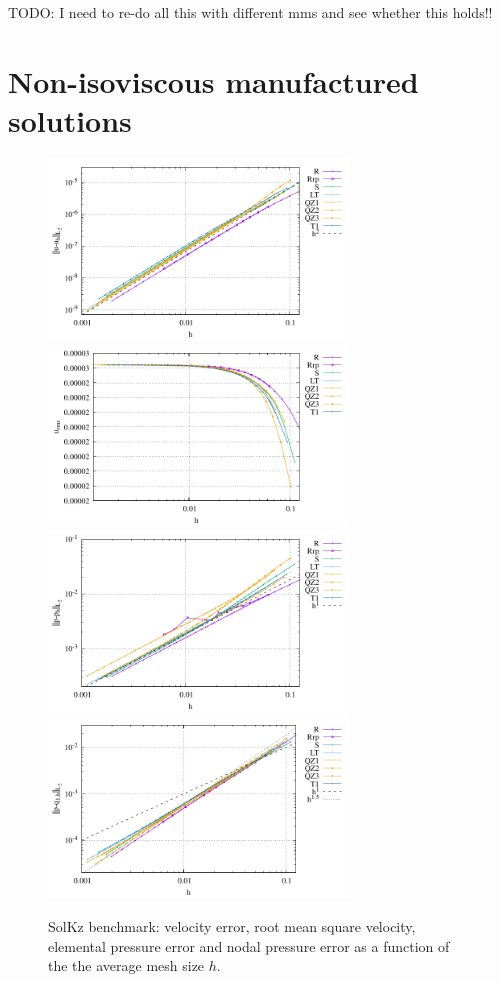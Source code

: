 \documentclass[a4paper]{article}
\begin{document}
{\color{red} TODO: I need to re-do all this with different mms and see whether this holds!!}


\section{Non-isoviscous manufactured solutions}





\begin{figure}
\centering
\includegraphics[width=8cm]{../results/errors_u_exp5}
\includegraphics[width=8cm]{../results/vrms_exp5} \\
\includegraphics[width=8cm]{../results/errors_p_exp5}
\includegraphics[width=8cm]{../results/errors_q1_exp5}
\caption{SolKz benchmark: velocity error, 
root mean square velocity, elemental pressure error and nodal pressure error
as a function of the the average mesh size $h$.} 
\label{fig:ressolkz}
\end{figure}
\end{document}

